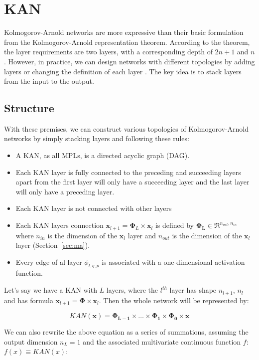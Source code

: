 \section{KAN}
Kolmogorov-Arnold networks are more expressive than their basic formulation from the Kolmogorov-Arnold representation theorem. 
According to the theorem, the layer requirements are two layers, with a corresponding depth of \(2n+1\) and \(n\). However, in practice, we can design networks with different topologies by adding layers or changing the definition of each layer \cite{KAN}. The key idea is to stack layers from the input to the output.

\subsection{Structure}
With these premises, we can construct various topologies of Kolmogorov-Arnold networks by simply stacking layers and following these rules:
\begin{itemize}
    \item A KAN, as all MPLs, is a directed acyclic graph (DAG). 
    \item Each KAN layer is fully connected to the preceding and succeeding layers apart from the first layer will only have a succeeding layer and the last layer will only have a preceding layer.
    \item Each KAN layer is not connected with other layers
    \item Each KAN layers connection $\textbf{x}_{l+1} = \boldsymbol{\Phi}_L \times \textbf{x}_l$ is defined by $\boldsymbol{\Phi_{L}} \in \Re^{n_{out},n_{in}}$ where $n_{in}$ is the dimension of the $\textbf{x}_l$ layer and $n_{out}$ is the dimension of the $\textbf{x}_l$ layer (Section~\ref{sec:ma}).
    \item Every edge of al layer $\phi_{l,q,p}$ is associated with a one-dimensional activation function. 
\end{itemize}

Let’s say we have a KAN with $L$ layers, where the $l^{th}$ layer has shape $n_{l+1}$, $n_l$ and has formula $\textbf{x}_{l+1} = \boldsymbol{\Phi} \times \textbf{x}_l $. Then the whole network will be represented by:

$$KAN(\textbf{x}) = \boldsymbol{\Phi_{L-1}} \times \dots \times \boldsymbol{\Phi_{1}} \times \boldsymbol{\Phi_{0}} \times \textbf{x}$$

We can also rewrite the above equation as a series of summations, assuming the output dimension $n_L = 1$ and the associated multivariate
continuous function $f$:  $f(x) \equiv KAN(x)$:

